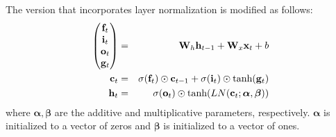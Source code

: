 \documentclass{article}
\begin{document}
The version that incorporates layer normalization is modified as follows:
%
\begin{eqnarray}
\begin{pmatrix}{\bf f}_t\\{\bf i}_t\\{\bf o}_t\\{\bf g}_t\end{pmatrix} &=& {\bf W}_h {\bf h}_{t-1} + {\bf W}_x {\bf x}_t + b \\
{\bf c}_t &=& \sigma({\bf f}_t) \odot {\bf c}_{t-1} + \sigma({\bf i}_t) \odot \text{tanh}({\bf g}_t) \\
{\bf h}_t &=& \sigma({\bf o}_t) \odot \text{tanh}(LN({\bf c}_t; \bm{\alpha}, \bm{\beta}))
\end{eqnarray}
%
where $\bm{\alpha}, \bm{\beta}$ are the additive and multiplicative parameters, respectively. $\bm{\alpha}$ is initialized to a vector of zeros and $\bm{\beta}$ is initialized to a vector of ones.
\end{document}

